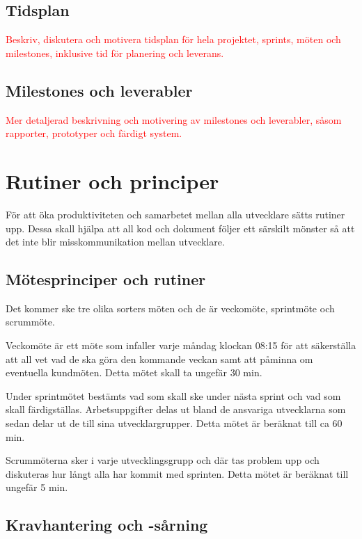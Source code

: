 \documentclass[a4paper,12pt,oneside,final]{extbook}
\begin{document}
\section{Tidsplan}

\textcolor{red}{Beskriv, diskutera och motivera tidsplan för hela projektet, sprints, möten och milestones, inklusive
tid för planering och leverans.}

\section{Milestones och leverabler}

\textcolor{red}{Mer detaljerad beskrivning och motivering av milestones och leverabler, såsom rapporter, prototyper
och färdigt system.
}


\chapter{Rutiner och principer}

För att öka produktiviteten och samarbetet mellan alla utvecklare sätts rutiner upp. Dessa skall hjälpa att all kod och dokument följer ett särskilt mönster så att det inte blir misskommunikation mellan utvecklare.

\section{Mötesprinciper och rutiner}

Det kommer ske tre olika sorters möten och de är veckomöte, sprintmöte och scrummöte.  

Veckomöte är ett möte som infaller varje måndag klockan 08:15 för att säkerställa att all vet vad de ska göra den kommande veckan samt att påminna om eventuella kundmöten. Detta mötet skall ta ungefär 30 min.

Under sprintmötet bestämts vad som skall ske under nästa sprint och vad som skall färdigställas. Arbetsuppgifter delas ut bland de ansvariga utvecklarna som sedan delar ut de till sina utvecklargrupper. Detta mötet är beräknat till ca 60 min.

Scrummöterna sker i varje utvecklingsgrupp och där tas problem upp och diskuteras hur långt alla har kommit med sprinten.  Detta mötet är beräknat till ungefär 5 min.

\section{Kravhantering och -sårning}
\end{document}
